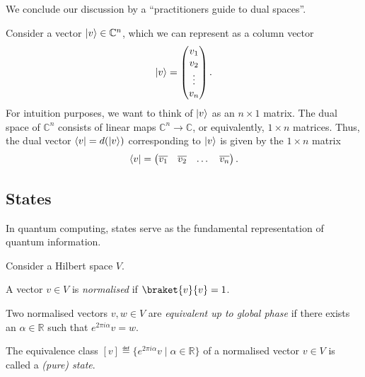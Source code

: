 \documentclass[a4paper, oneside, 12pt]{amsart}
\begin{document}
We conclude our discussion by a ``practitioners guide to dual spaces''.
\begin{remark}\label{rmk:the-practicioners-guide-to-dual-spaces}
  Consider a vector \( \lvert v\rangle \in \mathbb{C}^n \), which we can represent as a column vector
  \begin{equation*}
        \lvert v\rangle = \begin{pmatrix} v_1 \\ v_2 \\ \vdots \\ v_n \end{pmatrix}.
      \end{equation*}
      For intuition purposes, we want to think of \( \lvert v\rangle \) as an \( n \times 1 \) matrix.
      The dual space of \( \mathbb{C}^n \) consists of linear maps \( \mathbb{C}^n \to \mathbb{C} \), or equivalently, \( 1 \times n \) matrices.
      Thus, the dual vector \( \langle v\rvert = d(\lvert v\rangle) \) corresponding to \( \lvert v\rangle \) is given by the \(1 \times n\) matrix
      \begin{equation*}
        \langle v\rvert = \begin{pmatrix} \overline{v_1} & \overline{v_2} & \dots & \overline{v_n} \end{pmatrix}.
  \end{equation*}
\end{remark}

\subsection{States}
In quantum computing, states serve as the fundamental representation of quantum information.

\begin{definition}\label{def:states}
  Consider a Hilbert space \(V\).
  \begin{thmlist}
    \item A vector \(v\in V\) is \emph{normalised} if \(\braket{v}{v} = 1\).
    \item Two normalised vectors \(v,w\in V\) are \emph{equivalent up to global phase} if there exists an \(\alpha\in \mathbb{R}\) such that \(e^{2\pi i \alpha}v = w\).
    \item The equivalence class \([v]\eqdef \{ e^{2\pi i \alpha} v \mid \alpha \in \mathbb{R}\}\) of a normalised vector \(v \in V\) is called a \emph{(pure) state}.
  \end{thmlist}
\end{definition}
\end{document}
